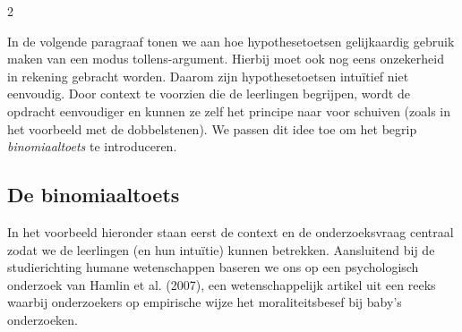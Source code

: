 \begin{multicols}{2}



In de volgende paragraaf tonen we aan hoe hypothesetoetsen gelijkaardig gebruik maken van een modus tollens-argument. Hierbij moet ook nog eens onzekerheid in rekening gebracht worden. Daarom zijn hypothesetoetsen intuïtief niet eenvoudig. Door context te voorzien die de leerlingen begrijpen, wordt de opdracht eenvoudiger en kunnen ze zelf het principe naar voor schuiven (zoals in het voorbeeld met de dobbelstenen). We passen dit idee toe om het begrip \emph{binomiaaltoets} te introduceren. 

\subsection*{De binomiaaltoets}

In het voorbeeld hieronder staan eerst de context en de onderzoeksvraag centraal zodat we de leerlingen (en hun intu\"itie) kunnen betrekken. Aansluitend bij de studierichting humane wetenschappen baseren we ons op een psychologisch onderzoek van Hamlin et al. (2007), een wetenschappelijk artikel uit een reeks waarbij onderzoekers op empirische wijze het moraliteitsbesef bij baby's onderzoeken. 


\end{multicols}
